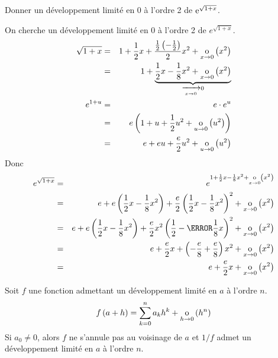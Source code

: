 \documentclass{magnoliaold}
\begin{document}
\begin{exoUnique}
\exo Donner un développement limité en 0 à l'ordre 2 de ${\rm e}^{\sqrt{1+x}}$.
  \begin{sol}
  On cherche un développement limité en 0 à l'ordre 2 de $e^{\sqrt{1+x}}$.
  \begin{eqnarray*}
  \sqrt{1+x} &=& 1+\frac{1}{2}x+\frac{\frac{1}{2}\p{-\frac{1}{2}}}{2}x^2
                 +\petitozero{x}{x^2}\\
             &=& 1+
    \underbrace{\frac{1}{2}x-\frac{1}{8}x^2+\petitozero{x}{x^2}}_{%
     \tendvers{x}{0}0}\\
  e^{1+u} &=& e\cdot e^u\\
         &=& e\p{1+u+\frac{1}{2}u^2+\petitozero{u}{u^2}}\\
         &=& e+eu+\frac{e}{2}u^2+\petitozero{u}{u^2}
  \end{eqnarray*}
  Donc
  \begin{eqnarray*}
  e^{\sqrt{1+x}}
  &=& e^{1+\frac{1}{2}x-\frac{1}{8}x^2+\petitozero{x}{x^2}}\\
  &=& e+e\p{\frac{1}{2}x-\frac{1}{8}x^2}+\frac{e}{2}
      \p{\frac{1}{2}x-\frac{1}{8}x^2}^2+\petitozero{x}{x^2}\\
  &=& e+e\p{\frac{1}{2}x-\frac{1}{8}x^2}+\frac{e}{2}
      x^2 \p{\frac{1}{2}-\cancel{\frac{1}{8}x}}^2+\petitozero{x}{x^2}\\
  &=& e+\frac{e}{2}x+\p{-\frac{e}{8}+\frac{e}{8}}x^2+\petitozero{x}{x^2}\\
  &=& e+\frac{e}{2}x+\petitozero{x}{x^2}
  \end{eqnarray*}    
  \end{sol}
\end{exoUnique}



\begin{proposition}[utile=-3]
Soit $f$ une fonction admettant un développement limité en $a$ à
l'ordre $n$.
\[f\left(a+h\right)=\sum_{k=0}^n a_k h^k+\underset{h \rightarrow 0}{\text{o}}\left(h^n\right)\]
Si $a_0\neq 0$, alors $f$ ne s'annule pas au voisinage de $a$ et $1/f$ admet un
développement limité en $a$ à l'ordre $n$.
\end{proposition}
\end{document}
